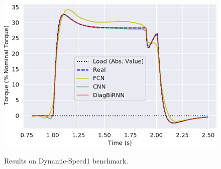 \documentclass{beamer}
\begin{document}
\begin{frame}
\begin{figure}
   \includegraphics[scale=0.3]{images/bench1_torque.pdf} \\
    \label{fig:dynamicspeed1}
    \caption{Results on Dynamic-Speed1 benchmark.}
    \vspace{-1em}
\end{figure}

\end{frame}


\end{document}
